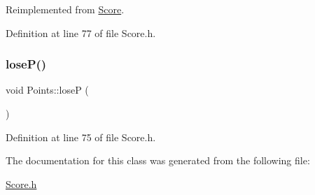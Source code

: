 Reimplemented from \hyperlink{class_score_a62f662eefb7584c4b039de697cd696e2}{Score}.



Definition at line 77 of file Score.\+h.

\hypertarget{class_points_a403a4aace0fcb9564687f35163024b04}{}\label{class_points_a403a4aace0fcb9564687f35163024b04} 
\subsubsection{\texorpdfstring{lose\+P()}{loseP()}}
{\footnotesize\ttfamily void Points\+::loseP (\begin{DoxyParamCaption}{ }\end{DoxyParamCaption})\hspace{0.3cm}{\ttfamily [inline]}}



Definition at line 75 of file Score.\+h.



The documentation for this class was generated from the following file\+:\begin{DoxyCompactItemize}
\item 
\hyperlink{_score_8h}{Score.\+h}\end{DoxyCompactItemize}
